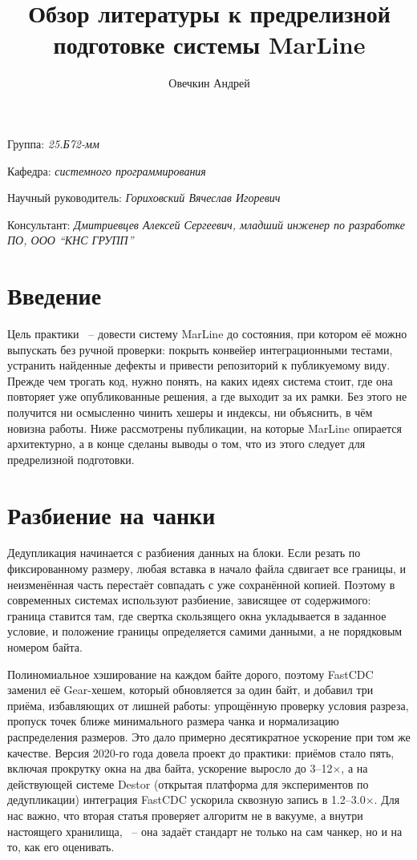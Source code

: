 \documentclass[a4paper]{article}
\title{Обзор литературы к предрелизной подготовке системы MarLine}
\author{Овечкин Андрей}
\date{}
\begin{document}
\maketitle

\begin{flushright}
    Группа: \emph{25.Б72-мм}

    Кафедра: \emph{системного программирования}

    Научный руководитель: \emph{Гориховский Вячеслав Игоревич}

    Консультант: \emph{Дмитриевцев Алексей Сергеевич, младший инженер по разработке ПО, ООО ``КНС ГРУПП''}
\end{flushright}

\section{Введение}

Цель практики ~-- довести систему MarLine до состояния, при котором её можно
выпускать без ручной проверки: покрыть конвейер интеграционными тестами,
устранить найденные дефекты и привести репозиторий к публикуемому виду.
Прежде чем трогать код, нужно понять, на каких идеях система стоит, где она
повторяет уже опубликованные решения, а где выходит за их рамки. Без этого
не получится ни осмысленно чинить хешеры и индексы, ни объяснить, в чём
новизна работы. Ниже рассмотрены публикации, на которые MarLine опирается
архитектурно, а в конце сделаны выводы о
том, что из этого следует для предрелизной подготовки.

\section{Разбиение на чанки}

Дедупликация начинается с разбиения данных на блоки. Если резать по
фиксированному размеру, любая вставка в начало файла сдвигает все границы, и
неизменённая часть перестаёт совпадать с уже сохранённой копией. Поэтому в
современных системах используют разбиение, зависящее от содержимого: граница
ставится там, где свертка скользящего окна укладывается в заданное условие,
и положение границы определяется самими данными, а не порядковым номером
байта.

Полиномиальное хэширование на каждом байте дорого, поэтому FastCDC
\cite{fastcdc2016} заменил её Gear-хешем, который обновляется за один байт,
и добавил три приёма, избавляющих от лишней работы: упрощённую проверку
условия разреза, пропуск точек ближе минимального размера чанка и
нормализацию распределения размеров. Это дало примерно десятикратное
ускорение при том же качестве. Версия 2020-го года \cite{fastcdc2020} довела
проект до практики: приёмов стало пять, включая прокрутку окна на два байта,
ускорение выросло до 3--12$\times$, а на действующей системе Destor
(открытая платформа для экспериментов по дедупликации)
интеграция FastCDC ускорила сквозную запись в 1.2--3.0$\times$. Для нас
важно, что вторая статья проверяет алгоритм не в вакууме, а внутри настоящего
хранилища, ~-- она задаёт стандарт не только на сам чанкер, но и на то, как
его оценивать.
\end{document}
